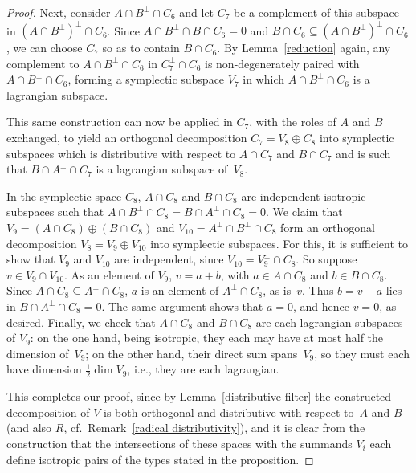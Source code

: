 \documentclass[10pt,a4paper]{amsart}
\numberwithin{equation}{section}
\begin{document}
\begin{proof}
Next, consider $A \cap B^{\perp} \cap C_6$ and let $C_7$ be a complement of this subspace in $(A \cap B^{\perp})^{\perp} \cap C_6$. Since $A \cap B^{\perp} \cap B \cap C_6 = 0$ and $B \cap C_6 \subseteq (A \cap B^{\perp})^{\perp} \cap C_6$, we can choose $C_7$ so as to contain $B \cap C_6$.  By Lemma~\ref{reduction} again, any complement to $A \cap B^{\perp} \cap C_6$ in $C_7^{\perp} \cap C_6$ is non-degenerately paired with $A \cap B^{\perp} \cap C_6$, forming a symplectic subspace $V_7$ in which $A \cap B^{\perp} \cap C_6$ is a lagrangian subspace.

This same construction can now be applied in $C_7$, with the roles of $A$ and $B$ exchanged, to yield an orthogonal decomposition $C_7 = V_8 \oplus C_8$ into symplectic subspaces which is distributive with respect to $A \cap C_7$ and $B \cap C_7$ and is such that $B \cap A^{\perp} \cap C_7$ is a lagrangian subspace of~$V_8$.

In the symplectic space $C_8$, $A \cap C_8$ and $B \cap C_8$ are independent isotropic subspaces such that $A \cap B^{\perp} \cap C_8 = B \cap A^{\perp} \cap C_8 = 0$. We claim that $V_9 = (A \cap C_8) \oplus (B \cap C_8)$ and $V_{10} = A^{\perp} \cap B^{\perp} \cap C_8$ form an orthogonal decomposition $V_8 = V_9 \oplus V_{10}$ into symplectic subspaces. For this, it is suf\/f\/icient to show that $V_9$ and $V_{10}$ are independent, since $V_{10} = V_9^{\perp} \cap C_8$. So suppose $v \in V_9 \cap V_{10}$. As an element of $V_9$, $v = a + b$, with $a \in A \cap C_8$ and $ b \in B \cap C_8$. Since $A \cap C_8 \subseteq A^{\perp} \cap C_8$, $a$ is an element of $A^{\perp} \cap C_8$, as is~$v$. Thus $b = v - a$ lies in $B \cap A^{\perp} \cap C_8 = 0$. The same argument shows that $a =0$, and hence $v = 0$, as desired. Finally, we check that $A \cap C_8$ and $B \cap C_8$ are each lagrangian subspaces of $V_9$: on the one hand, being isotropic, they each may have at most half the dimension of~$V_9$; on the other hand, their direct sum spans~$V_9$, so they must each have dimension $\tfrac{1}{2}\dim V_9$,  i.e., they are each lagrangian.

This completes our proof, since by Lemma~\ref{distributive filter} the constructed decomposition of $V$ is both orthogonal and distributive with respect to~$A$ and $B$ (and also $R$,  cf.\ Remark~\ref{radical distributivity}), and it is clear from the construction that the intersections of these spaces with the summands $V_i$ each def\/ine isotropic pairs of the types stated in the proposition.
\end{proof}
\end{document}
